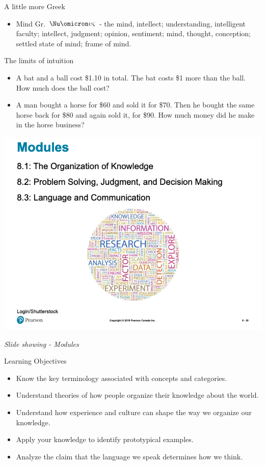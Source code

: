 \documentclass[
]{book}
\providecommand{\tightlist}{%
  \setlength{\itemsep}{0pt}\setlength{\parskip}{0pt}}
\begin{document}
A little more Greek

\begin{itemize}
\tightlist
\item
  Mind Gr. \(\Nu\omicron\upsilon\varsigma\) - the mind, intellect; understanding, intelligent faculty; intellect, judgment; opinion, sentiment; mind, thought, conception; settled state of mind; frame of mind.
\end{itemize}

The limits of intuition

\begin{itemize}
\tightlist
\item
  A bat and a ball cost \$1.10 in total. The bat costs \$1 more than the ball. How much does the ball cost?\\
\item
  A man bought a horse for \$60 and sold it for \$70. Then he bought the same horse back for \$80 and again sold it, for \$90. How much money did he make in the horse business?
\end{itemize}

\includegraphics{assets/unit_1/slide_39.png}

\emph{Slide showing - Modules}

Learning Objectives

\begin{itemize}
\tightlist
\item
  Know the key terminology associated with concepts and categories.\\
\item
  Understand theories of how people organize their knowledge about the world.\\
\item
  Understand how experience and culture can shape the way we organize our knowledge.\\
\item
  Apply your knowledge to identify prototypical examples.\\
\item
  Analyze the claim that the language we speak determines how we think.
\end{itemize}
\end{document}
